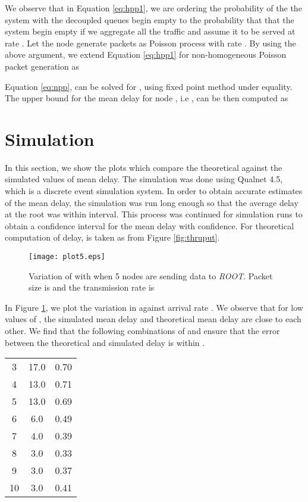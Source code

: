 \documentclass[10pt, conference, compsocconf]{IEEEtran}
\begin{document}
We observe that in Equation \eqref{eq:hpp1}, we are ordering the probability of the the system with the decoupled queues begin empty to the probability that that the system begin empty if we aggregate all the traffic and assume it to be served at rate . Let the node  generate packets as Poisson process with rate . By using the above argument, we extend Equation \eqref{eq:hpp1} for non-homogeneous Poisson packet generation as

Equation \ref{eq:npp}, can be solved for , using fixed point method under equality. The upper bound for the mean delay for node , i.e , can be then computed as


\section{\large{Simulation}}
\label{sim}
In this section, we show the plots which compare the theoretical against the simulated values of mean delay. The simulation was done using Qualnet 4.5, which is a discrete event simulation system. In order to obtain accurate estimates of the mean delay, the simulation was run long enough so that the average delay at the root was within  interval. This process was continued for  simulation runs to obtain a confidence interval for the mean delay with  confidence. For theoretical computation of delay,  is taken as  from Figure \ref{fig:thruput}.

\begin{figure}[!h]
\centering
\texttt{[image: plot5.eps]}
\caption{Variation of  with  when 5 nodes are sending data to \textit{ROOT}. Packet size is  and the transmission rate is  }
\label{fig:plot5}
\end{figure}

\newpage
In Figure \ref{fig:plot5}, we plot the variation in  against arrival rate . We observe that for low values of , the simulated mean delay and theoretical mean delay are close to each other. We find that the following combinations of  and  ensure that the error between the theoretical and simulated delay is within .

\begin{center}
\begin{tabular}{|c|c|c|}
\hline  &  & \\  
\hline 3 &  17.0 & 0.70\\ 
\hline 4 &  13.0 & 0.71\\ 
\hline 5 &  13.0 & 0.69\\
\hline 6 &  6.0 & 0.49\\
\hline 7 &  4.0 & 0.39\\
\hline 8 &  3.0 & 0.33\\
\hline 9 &  3.0 & 0.37\\
\hline 10 & 3.0  & 0.41\\
\hline
\end{tabular} 
\end{center}
\end{document}
